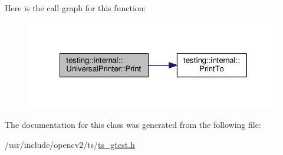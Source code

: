 Here is the call graph for this function\-:\nopagebreak
\begin{figure}[H]
\begin{center}
\leavevmode
\includegraphics[width=320pt]{classtesting_1_1internal_1_1UniversalPrinter_a6a7d29444412467c14931bc55a046138_cgraph}
\end{center}
\end{figure}




The documentation for this class was generated from the following file\-:\begin{DoxyCompactItemize}
\item 
/usr/include/opencv2/ts/\hyperlink{ts__gtest_8h}{ts\-\_\-gtest.\-h}\end{DoxyCompactItemize}
